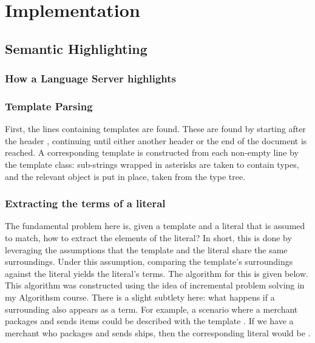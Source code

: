 \documentclass[../main.tex]{subfiles}
\begin{document}
\chapter{Implementation}
%
%
%
\section{Semantic Highlighting}
\subsection{How a Language Server highlights}

\subsection{Template Parsing}
First, the lines containing templates are found. These are found by starting after the header , continuing until either another header or the end of the document is reached. A corresponding template is constructed from each non-empty line by the template class: sub-strings wrapped in asterisks are taken to contain types, and the relevant  object is put in place, taken from the type tree.

\subsection{Extracting the terms of a literal}
The fundamental problem here is, given a template  and a literal  that is assumed to match, how to extract the elements of the literal? In short, this is done by leveraging the assumptions that the template and the literal share the same surroundings. Under this assumption, comparing the template's surroundings against the literal yields the literal's terms. The algorithm for this is given below.
This algorithm was constructed using the idea of incremental problem solving in my Algorithsm course.
There is a slight subtlety here: what happens if a surrounding also appears as a term. For example, a scenario where a merchant packages and sends items could be described with the template . If we have a merchant who packages and sends ships, then the corresponding literal would be .
\end{document}
